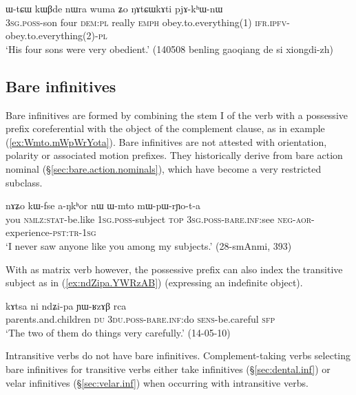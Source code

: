  \begin{exe}
\ex \label{ex:NAtCWkAti}
\gll  ɯ-tɕɯ kɯβde nɯra wuma ʑo ŋɤtɕɯkɤti pjɤ-kʰɯ-nɯ  \\
\textsc{3sg}.\textsc{poss}-son four \textsc{dem}:\textsc{pl} really \textsc{emph} obey.to.everything(1) \textsc{ifr}.\textsc{ipfv}-obey.to.everything(2)-\textsc{pl} \\
\glt `His four sons were very obedient.' (140508 benling gaoqiang de si xiongdi-zh)
\end{exe} 

\subsection{Bare infinitives} \label{sec:bare.inf}
Bare infinitives are formed by combining the stem I of the verb with a possessive prefix coreferential with the object of the complement clause, as in example (\ref{ex:Wmto.mWpWrYota}). Bare infinitives are not attested with orientation, polarity or associated motion prefixes. They historically derive from bare action nominal (§\ref{sec:bare.action.nominals}), which have become a very restricted subclass.

\begin{exe} 
\ex \label{ex:Wmto.mWpWrYota}
\gll nɤʑo kɯ-fse a-ŋkʰor nɯ ɯ-mto mɯ-pɯ-rɲo-t-a \\
you \textsc{nmlz}:\textsc{stat}-be.like \textsc{1sg}.\textsc{poss}-subject \textsc{top} \textsc{3sg}.\textsc{poss}-\textsc{bare}.\textsc{inf}:see \textsc{neg}-\textsc{aor}-experience-\textsc{pst}:\textsc{tr}-\textsc{1sg} \\
\glt `I never saw anyone like you among my subjects.' (28-smAnmi,  393) 
\end{exe} 

With  as matrix verb however, the possessive prefix can also index the transitive subject as in (\ref{ex:ndZipa.YWRzAB}) (expressing an indefinite object).

\begin{exe}
\ex \label{ex:ndZipa.YWRzAB}
\gll kɤtsa ni ndʑi-pa ɲɯ-ʁzɤβ rca \\
parents.and.children \textsc{du} \textsc{3du}.\textsc{poss}-\textsc{bare}.\textsc{inf}:do \textsc{sens}-be.careful \textsc{sfp} \\
\glt `The two of them do things very carefully.' (14-05-10)
\end{exe}

Intransitive verbs do not have bare infinitives. Complement-taking verbs selecting bare infinitives for transitive verbs either take  infinitives (§\ref{sec:dental.inf}) or velar infinitives (§\ref{sec:velar.inf}) when occurring with intransitive verbs.

